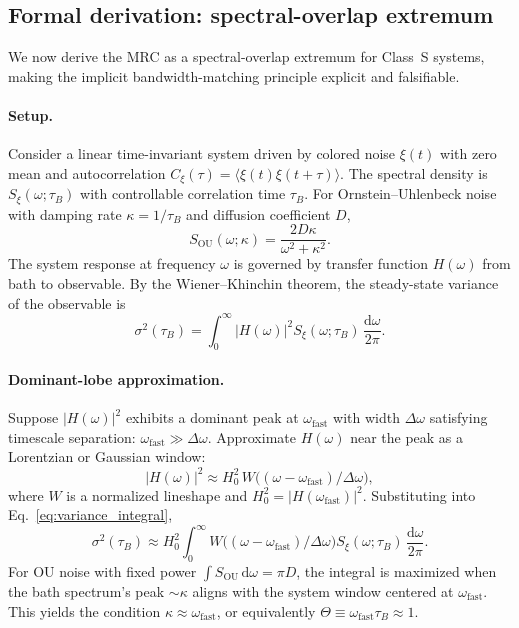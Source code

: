 \documentclass[11pt,letterpaper]{article}
\begin{document}
\subsection{Formal derivation: spectral-overlap extremum}
\label{sec:spectral_extremum}

We now derive the MRC as a spectral-overlap extremum for Class~S systems, making the implicit bandwidth-matching principle explicit and falsifiable.

\paragraph{Setup.} Consider a linear time-invariant system driven by colored noise $\xi(t)$ with zero mean and autocorrelation $C_\xi(\tau)=\langle\xi(t)\xi(t+\tau)\rangle$. The spectral density is $S_\xi(\omega;\tau_B)$ with controllable correlation time $\tau_B$. For Ornstein--Uhlenbeck noise~\cite{Uhlenbeck1930} with damping rate $\kappa=1/\tau_B$ and diffusion coefficient $D$,
\begin{equation}
S_{\text{OU}}(\omega;\kappa) = \frac{2D\kappa}{\omega^2 + \kappa^2}.
\label{eq:ou_spectrum}
\end{equation}
The system response at frequency $\omega$ is governed by transfer function $H(\omega)$ from bath to observable. By the Wiener--Khinchin theorem, the steady-state variance of the observable is
\begin{equation}
\sigma^2(\tau_B) = \int_0^\infty |H(\omega)|^2 S_\xi(\omega;\tau_B)\,\frac{\mathrm{d}\omega}{2\pi}.
\label{eq:variance_integral}
\end{equation}

\paragraph{Dominant-lobe approximation.} Suppose $|H(\omega)|^2$ exhibits a dominant peak at $\omega_{\mathrm{fast}}$ with width $\Delta\omega$ satisfying timescale separation: $\omega_{\mathrm{fast}} \gg \Delta\omega$. Approximate $H(\omega)$ near the peak as a Lorentzian or Gaussian window:
\begin{equation}
|H(\omega)|^2 \approx H_0^2 \,W\bigl((\omega-\omega_{\mathrm{fast}})/\Delta\omega\bigr),
\end{equation}
where $W$ is a normalized lineshape and $H_0^2 = |H(\omega_{\mathrm{fast}})|^2$. Substituting into Eq.~\eqref{eq:variance_integral},
\begin{equation}
\sigma^2(\tau_B) \approx H_0^2 \int_0^\infty W\bigl((\omega-\omega_{\mathrm{fast}})/\Delta\omega\bigr) S_\xi(\omega;\tau_B)\,\frac{\mathrm{d}\omega}{2\pi}.
\end{equation}
For OU noise with fixed power $\int S_{\text{OU}}\,\mathrm{d}\omega = \pi D$, the integral is maximized when the bath spectrum's peak $\sim\kappa$ aligns with the system window centered at $\omega_{\mathrm{fast}}$. This yields the condition $\kappa \approx \omega_{\mathrm{fast}}$, or equivalently $\Theta \equiv \omega_{\mathrm{fast}}\tau_B \approx 1$.
\end{document}
